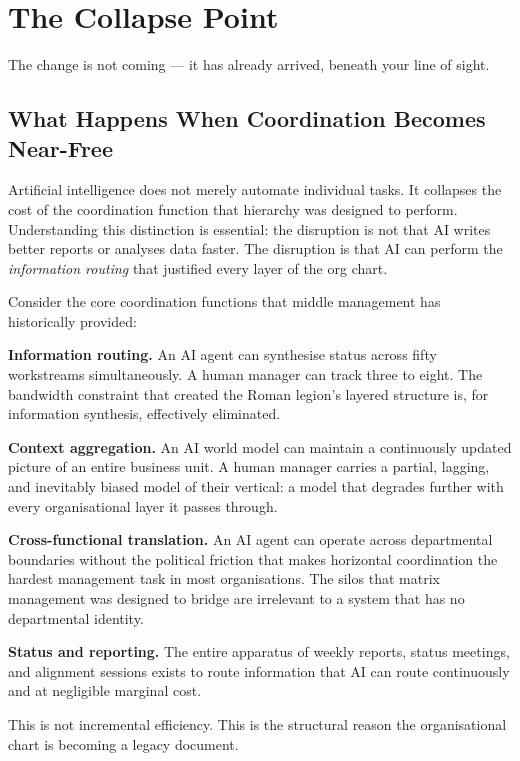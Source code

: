 \chapter{The Collapse Point}
\label{ch:collapse-point}

\epigraph{The change is not coming --- it has already arrived, beneath your line of sight.}{}

\section{What Happens When Coordination Becomes Near-Free}

Artificial intelligence does not merely automate individual tasks. It collapses the cost of the coordination function that hierarchy was designed to perform. Understanding this distinction is essential: the disruption is not that AI writes better reports or analyses data faster. The disruption is that AI can perform the \emph{information routing} that justified every layer of the org chart.

Consider the core coordination functions that middle management has historically provided:

\textbf{Information routing.} An AI agent can synthesise status across fifty workstreams simultaneously. A human manager can track three to eight. The bandwidth constraint that created the Roman legion's layered structure is, for information synthesis, effectively eliminated.

\textbf{Context aggregation.} An AI world model can maintain a continuously updated picture of an entire business unit. A human manager carries a partial, lagging, and inevitably biased model of their vertical: a model that degrades further with every organisational layer it passes through.

\textbf{Cross-functional translation.} An AI agent can operate across departmental boundaries without the political friction that makes horizontal coordination the hardest management task in most organisations. The silos that matrix management was designed to bridge are irrelevant to a system that has no departmental identity.

\textbf{Status and reporting.} The entire apparatus of weekly reports, status meetings, and alignment sessions exists to route information that AI can route continuously and at negligible marginal cost.

This is not incremental efficiency. This is the structural reason the organisational chart is becoming a legacy document.

